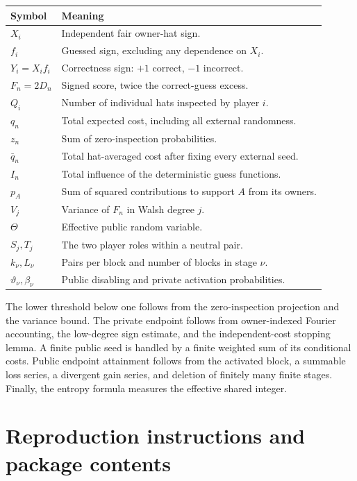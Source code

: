 \documentclass[11pt,letterpaper]{article}
\theoremstyle{definition}
\begin{document}
\begin{center}
\begin{tabularx}{\textwidth}{@{}p{}X@{}}
\toprule
Symbol & Meaning\\
\midrule
$X_i$ & Independent fair owner-hat sign.\\
$f_i$ & Guessed sign, excluding any dependence on $X_i$.\\
$Y_i=X_if_i$ & Correctness sign: $+1$ correct, $-1$ incorrect.\\
$F_n=2D_n$ & Signed score, twice the correct-guess excess.\\
$Q_i$ & Number of individual hats inspected by player $i$.\\
$q_n$ & Total expected cost, including all external randomness.\\
$z_n$ & Sum of zero-inspection probabilities.\\
$\bar q_n$ & Total hat-averaged cost after fixing every external seed.\\
$I_n$ & Total influence of the deterministic guess functions.\\
$p_A$ & Sum of squared contributions to support $A$ from its owners.\\
$V_j$ & Variance of $F_n$ in Walsh degree $j$.\\
$\Theta$ & Effective public random variable.\\
$S_j,T_j$ & The two player roles within a neutral pair.\\
$k_\nu,L_\nu$ & Pairs per block and number of blocks in stage $\nu$.\\
$\vartheta_\nu,\beta_\nu$ & Public disabling and private activation probabilities.\\
\bottomrule
\end{tabularx}
\end{center}

The lower threshold below one follows from the zero-inspection
projection and the variance bound. The private endpoint follows from
owner-indexed Fourier accounting, the low-degree sign estimate, and
the independent-cost stopping lemma. A finite public seed is handled
by a finite weighted sum of its conditional costs. Public endpoint
attainment follows from the activated block, a summable loss series,
a divergent gain series, and deletion of finitely many finite stages.
Finally, the entropy formula measures the effective shared integer.

\section{Reproduction instructions and package contents}
\label{mbg:rnd:app:repro}
\end{document}
